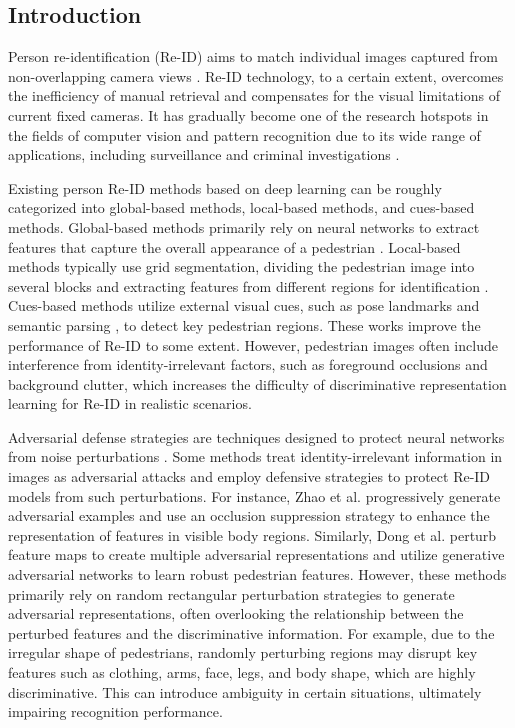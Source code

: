 \documentclass[12pt]{spieman}  %
\begin{document}
\begin{spacing}{2}   %

\section{Introduction}
\label{sect:intro}  %
Person re-identification (Re-ID) aims to match individual images captured from non-overlapping camera views \cite{nambiar2019gait}. Re-ID technology, to a certain extent, overcomes the inefficiency of manual retrieval and compensates for the visual limitations of current fixed cameras. It has gradually become one of the research hotspots in the fields of computer vision and pattern recognition due to its wide range of applications, including surveillance and criminal investigations \cite{zhang2024joint,wang2023multi,hu2024pose}.

Existing person Re-ID methods based on deep learning can be roughly categorized into global-based methods, local-based methods, and cues-based methods. Global-based methods primarily rely on neural networks to extract features that capture the overall appearance of a pedestrian \cite{luo2019bag, ghorbel2022masking}. Local-based methods typically use grid segmentation, dividing the pedestrian image into several blocks and extracting features from different regions for identification \cite{sun2018beyond, zhang2021appearance}. Cues-based methods utilize external visual cues, such as pose landmarks \cite{miao2019pose} and semantic parsing \cite{guo2019beyond}, to detect key pedestrian regions. These works improve the performance of Re-ID to some extent. However, pedestrian images often include interference from identity-irrelevant factors, such as foreground occlusions and background clutter, which increases the difficulty of discriminative representation learning for Re-ID in realistic scenarios.

Adversarial defense strategies are techniques designed to protect neural networks from noise perturbations \cite{szegedy2013intriguing, wang2020transferable, wang2022occluded}. Some methods treat identity-irrelevant information in images as adversarial attacks and employ defensive strategies to protect Re-ID models from such perturbations. For instance, Zhao et al. \cite{zhao2021incremental} progressively generate adversarial examples and use an occlusion suppression strategy to enhance the representation of features in visible body regions. Similarly, Dong et al. \cite{dong2023erasing} perturb feature maps to create multiple adversarial representations and utilize generative adversarial networks to learn robust pedestrian features. However, these methods primarily rely on random rectangular perturbation strategies to generate adversarial representations, often overlooking the relationship between the perturbed features and the discriminative information. For example, due to the irregular shape of pedestrians, randomly perturbing regions may disrupt key features such as clothing, arms, face, legs, and body shape, which are highly discriminative. This can introduce ambiguity in certain situations, ultimately impairing recognition performance.


\end{spacing}
\end{document}
